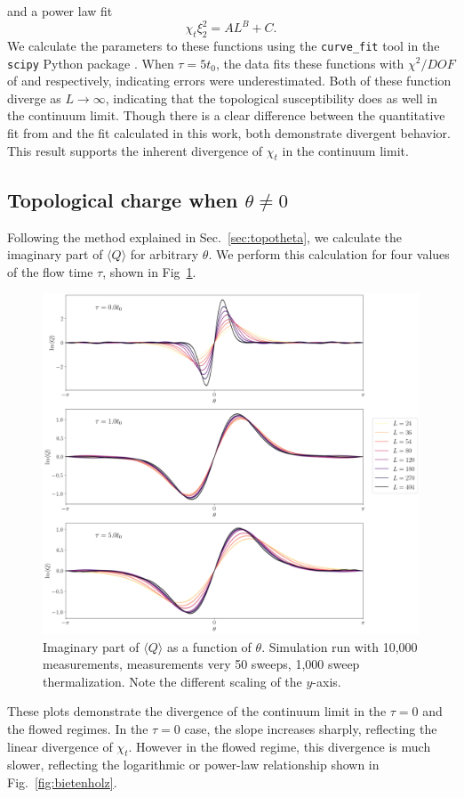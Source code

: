 and a power law fit
\begin{equation}
    \chi_t \xi_2^2 = A L^B + C.
\end{equation}
We calculate the parameters to these functions using the \texttt{curve\_fit} tool in the \texttt{scipy} Python package \cite{virtanen2020}. When $\tau=5t_0$, the data fits these functions with $\chi^2/DOF$ of \logchi and \powchi respectively, indicating errors were underestimated. Both of these function diverge as $L\rightarrow \infty$, indicating that the topological susceptibility does as well in the continuum limit. Though there is a clear difference between the quantitative fit from \cite{bietenholz2018} and the fit calculated in this work, both demonstrate divergent behavior. This result supports the inherent divergence of $\chi_t$ in the continuum limit.


\subsection{Topological charge when $\theta\neq 0$}
Following the method explained in Sec.~\ref{sec:topotheta}, we calculate the imaginary part of $\langle Q \rangle$ for arbitrary $\theta$. We perform this calculation for four values of the flow time $\tau$, shown in Fig~\ref{fig:theta}.
\begin{figure}[h!]
    \centering
      \includegraphics[width=\textwidth]{imgs/theta.png}
      \caption{\label{fig:theta} Imaginary part of $\langle Q \rangle$ as a function of $\theta$. Simulation run with 10,000 measurements, measurements very 50 sweeps, 1,000 sweep thermalization. Note the different scaling of the $y$-axis.}
\end{figure}
These plots demonstrate the divergence of the continuum limit in the $\tau=0$ and the flowed regimes. In the $\tau=0$ case, the slope increases sharply, reflecting the linear divergence of $\chi_t$. However in the flowed regime, this divergence is much slower, reflecting the logarithmic or power-law relationship shown in Fig.~\ref{fig:bietenholz}.


